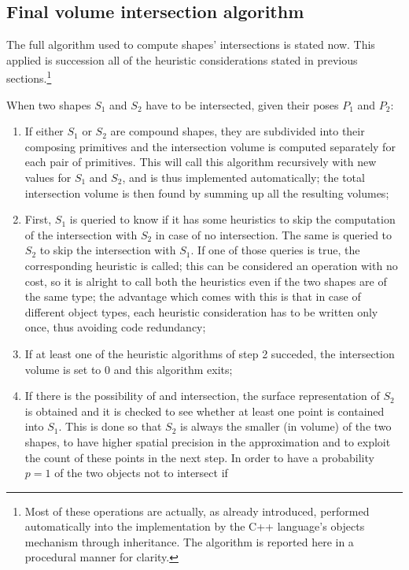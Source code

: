 \subsection{Final volume intersection algorithm}
The full algorithm used to compute shapes' intersections is stated
now. This applied is succession all of the heuristic considerations
stated in previous sections.\footnote{Most of these operations are
  actually, as already introduced, performed automatically into the
  implementation by the C++
  language's objects mechanism through inheritance. The algorithm is
  reported here in a procedural manner for clarity.}

When two shapes $S_1$ and $S_2$ have to be intersected, given their poses $P_1$ and $P_2$:
\begin{enumerate}
  \item{If either $S_1$ or $S_2$ are compound shapes, they are
    subdivided into their composing primitives and the intersection
    volume is computed separately for each pair of primitives. This
    will call this algorithm recursively with new values for $S_1$ and
    $S_2$, and is thus implemented automatically; the total
    intersection volume is then found by summing up all the resulting volumes;}
  \item{First, $S_1$ is queried to know if it has some heuristics to
    skip the computation of the intersection with $S_2$ in case of no
    intersection. The same is queried to $S_2$ to skip the
    intersection with $S_1$. If one of those queries is true, the
    corresponding heuristic is called; this can be considered an
    operation with no cost, so it is alright to call both the
    heuristics even if the two shapes are of the same type; the
    advantage which comes with this is that in case of different
    object types, each heuristic consideration has to be written only
    once, thus avoiding code redundancy;}
  \item{If at least one of the heuristic algorithms of step 2
    succeded, the intersection volume is set to $0$ and this algorithm
    exits;}
  \item{If there is the possibility of and intersection, the surface
    representation of $S_2$ is obtained and it is checked to see
    whether at least one point is contained into $S_1$. This is done
    so that $S_2$ is always the smaller (in volume) of the two shapes,
    to have higher spatial precision in the approximation and to
    exploit the count of these points in the next step.
    In order to
    have a probability $p=1$ of the two objects not to intersect if
}
\end{enumerate}
